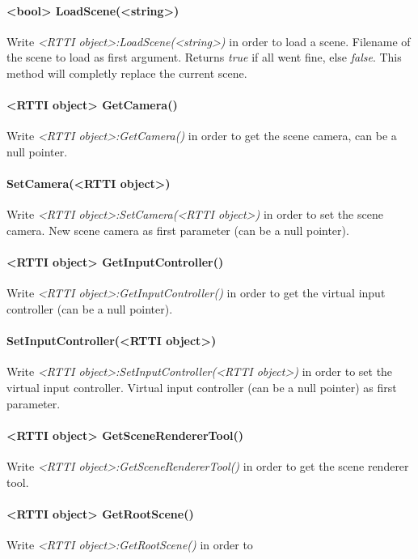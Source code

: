 \paragraph{<bool> LoadScene(<string>)}
Write \emph{<RTTI object>:LoadScene(<string>)} in order to load a scene. Filename of the scene to load as first argument. Returns \emph{true} if all went fine, else \emph{false}. This method will completly replace the current scene.

\paragraph{<RTTI object> GetCamera()}
Write \emph{<RTTI object>:GetCamera()} in order to get the scene camera, can be a null pointer.

\paragraph{SetCamera(<RTTI object>)}
Write \emph{<RTTI object>:SetCamera(<RTTI object>)} in order to set the scene camera. New scene camera as first parameter (can be a null pointer).

\paragraph{<RTTI object> GetInputController()}
Write \emph{<RTTI object>:GetInputController()} in order to get the virtual input controller (can be a null pointer).

\paragraph{SetInputController(<RTTI object>)}
Write \emph{<RTTI object>:SetInputController(<RTTI object>)} in order to set the virtual input controller. Virtual input controller (can be a null pointer) as first parameter.

\paragraph{<RTTI object> GetSceneRendererTool()}
Write \emph{<RTTI object>:GetSceneRendererTool()} in order to get the scene renderer tool.

\paragraph{<RTTI object> GetRootScene()}
Write \emph{<RTTI object>:GetRootScene()} in order to 

